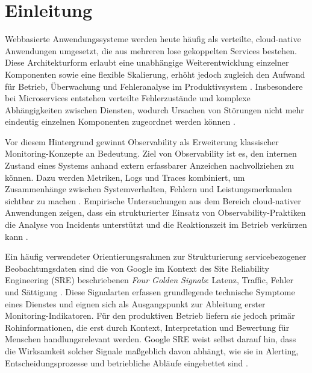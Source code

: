

\section{Einleitung}

Webbasierte Anwendungssysteme werden heute häufig als verteilte, cloud-native Anwendungen umgesetzt, die aus mehreren lose gekoppelten Services bestehen. Diese Architekturform erlaubt eine unabhängige Weiterentwicklung einzelner Komponenten sowie eine flexible Skalierung, erhöht jedoch zugleich den Aufwand für Betrieb, Überwachung und Fehleranalyse im Produktivsystem \cite{faseeha2025observability,sakinala2025observability}. Insbesondere bei Microservices entstehen verteilte Fehlerzustände und komplexe Abhängigkeiten zwischen Diensten, wodurch Ursachen von Störungen nicht mehr eindeutig einzelnen Komponenten zugeordnet werden können \cite{fischer2024microservice}.

Vor diesem Hintergrund gewinnt Observability als Erweiterung klassischer Monitoring-Konzepte an Bedeutung. Ziel von Observability ist es, den internen Zustand eines Systems anhand extern erfassbarer Anzeichen nachvollziehen zu können. Dazu werden Metriken, Logs und Traces kombiniert, um Zusammenhänge zwischen Systemverhalten, Fehlern und Leistungsmerkmalen sichtbar zu machen \cite{sridharan2018distributed,faseeha2025observability}. Empirische Untersuchungen aus dem Bereich cloud-nativer Anwendungen zeigen, dass ein strukturierter Einsatz von Observability-Praktiken die Analyse von Incidents unterstützt und die Reaktionszeit im Betrieb verkürzen kann \cite{giamattei2024monitoring,sakinala2025observability}.

Ein häufig verwendeter Orientierungsrahmen zur Strukturierung servicebezogener Beobachtungsdaten sind die von Google im Kontext des Site Reliability Engineering (SRE) beschriebenen \emph{Four Golden Signals}: Latenz, Traffic, Fehler und Sättigung \cite{ewaschukMonitoringDistributedSystems}. Diese Signalarten erfassen grundlegende technische Symptome eines Dienstes und eignen sich als Ausgangspunkt zur Ableitung erster Monitoring-Indikatoren. Für den produktiven Betrieb liefern sie jedoch primär Rohinformationen, die erst durch Kontext, Interpretation und Bewertung für Menschen handlungsrelevant werden. Google SRE weist selbst darauf hin, dass die Wirksamkeit solcher Signale maßgeblich davon abhängt, wie sie in Alerting, Entscheidungsprozesse und betriebliche Abläufe eingebettet sind \cite{ewaschukMonitoringDistributedSystems}.

